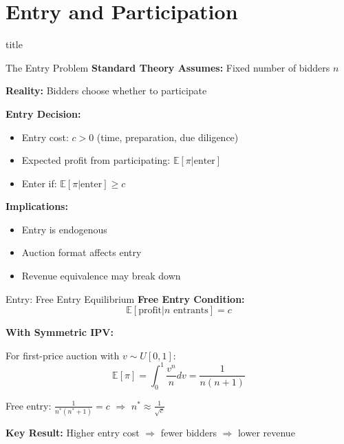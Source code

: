 \documentclass[xcolor={x11names}, aspectratio=169 ]{beamer}
\newcommand{\E}{\mathbb{E}}
\newcommand{\sectionslide}{%
  \begin{frame}
    \vfill
    \centering
    \begin{beamercolorbox}[sep=8pt,center,shadow=true,rounded=true]{title}
      \usebeamerfont{title}\insertsectionhead\par%
    \end{beamercolorbox}
    \vfill
  \end{frame}
}
\begin{document}
\section{Entry and Participation}
\sectionslide

\begin{frame}{The Entry Problem}
\textbf{Standard Theory Assumes:} Fixed number of bidders $n$

\textbf{Reality:} Bidders choose whether to participate

\textbf{Entry Decision:}
\begin{itemize}
  \item Entry cost: $c > 0$ (time, preparation, due diligence)
  \item Expected profit from participating: $\E[\pi | \text{enter}]$
  \item Enter if: $\E[\pi | \text{enter}] \geq c$
\end{itemize}

\textbf{Implications:}
\begin{itemize}
  \item Entry is endogenous
  \item Auction format affects entry
  \item Revenue equivalence may break down
\end{itemize}
\end{frame}

\begin{frame}{Entry: Free Entry Equilibrium}
\textbf{Free Entry Condition:}
$$\E[\text{profit} | n \text{ entrants}] = c$$

\textbf{With Symmetric IPV:}

For first-price auction with $v \sim U[0,1]$:
$$\E[\pi] = \int_0^1 \frac{v^n}{n} dv = \frac{1}{n(n+1)}$$

Free entry: $\frac{1}{n^*(n^*+1)} = c$ $\Rightarrow$ $n^* \approx \frac{1}{\sqrt{c}}$

\textbf{Key Result:} Higher entry cost $\Rightarrow$ fewer bidders $\Rightarrow$ lower revenue
\end{frame}
\end{document}
